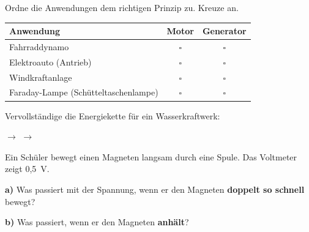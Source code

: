 \documentclass[a4paper,11pt]{article}
\newcommand{\luecke}[1]{\underline{\hspace{#1}}}
\begin{document}

\begin{aufgabebox}

Ordne die Anwendungen dem richtigen Prinzip zu. Kreuze an.

\vspace{2mm}
\begin{tabularx}{\textwidth}{|X|c|c|}
\hline
\textbf{Anwendung} & \textbf{Motor} & \textbf{Generator} \\
\hline
Fahrraddynamo & $\square$ & $\square$ \\[0.4em]
\hline
Elektroauto (Antrieb) & $\square$ & $\square$ \\[0.4em]
\hline
Windkraftanlage & $\square$ & $\square$ \\[0.4em]
\hline
Faraday-Lampe (Schütteltaschenlampe) & $\square$ & $\square$ \\[0.4em]
\hline
\end{tabularx}

\end{aufgabebox}

\vspace{4mm}

\begin{aufgabebox}

Vervollständige die Energiekette für ein Wasserkraftwerk:

\vspace{3mm}
\begin{center}
 $\rightarrow$ \fbox{\luecke{3cm}} $\rightarrow$ \fbox{\luecke{3.5cm}}
\end{center}

\end{aufgabebox}

\vspace{4mm}

\begin{aufgabebox}

Ein Schüler bewegt einen Magneten langsam durch eine Spule. Das Voltmeter zeigt 0,5~V.

\vspace{2mm}
\textbf{a)} Was passiert mit der Spannung, wenn er den Magneten \textbf{doppelt so schnell} bewegt?

\vspace{1cm}

\textbf{b)} Was passiert, wenn er den Magneten \textbf{anhält}?

\vspace{1cm}

\end{aufgabebox}
\end{document}
